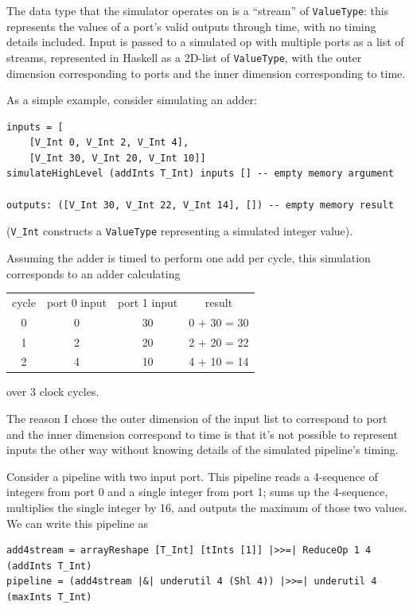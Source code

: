 \documentclass[12pt]{article}
\begin{document}
The data type that the simulator operates on is a ``stream'' of
\texttt{ValueType}: this represents the values of a port's valid
outputs through time, with no timing details included. Input is passed
to a simulated op with multiple ports as a list of streams,
represented in Haskell as a 2D-list of \texttt{ValueType}, with the
outer dimension corresponding to ports and the inner dimension
corresponding to time.

As a simple example, consider simulating an adder:

\begin{verbatim}
inputs = [
    [V_Int 0, V_Int 2, V_Int 4],
    [V_Int 30, V_Int 20, V_Int 10]]
simulateHighLevel (addInts T_Int) inputs [] -- empty memory argument

outputs: ([V_Int 30, V_Int 22, V_Int 14], []) -- empty memory result
\end{verbatim}

(\texttt{V\_Int} constructs a \texttt{ValueType} representing a
simulated integer value).

Assuming the adder is timed to perform one add per cycle, this simulation
corresponds to an adder calculating
\begin{center}
\begin{tabular}{c|c c|c}
cycle & port 0 input & port 1 input & result\\
0 & 0 & 30 & 0 + 30 = 30 \\
1 & 2 & 20 & 2 + 20 = 22 \\
2 & 4 & 10 & 4 + 10 = 14
\end{tabular}
\end{center}
over 3 clock cycles.

The reason I chose the outer dimension of the input list to correspond to
port and the inner dimension correspond to time is that it's not possible
to represent inputs the other way without knowing details of the simulated
pipeline's timing.

Consider a pipeline with two input port. This pipeline reads a 4-sequence
of integers from port 0 and a single integer from port 1; sums up the
4-sequence, multiplies the single integer by 16, and outputs the
maximum of those two values. We can write this pipeline as

\begin{verbatim}
add4stream = arrayReshape [T_Int] [tInts [1]] |>>=| ReduceOp 1 4 (addInts T_Int)
pipeline = (add4stream |&| underutil 4 (Shl 4)) |>>=| underutil 4 (maxInts T_Int)
\end{verbatim}
\end{document}
